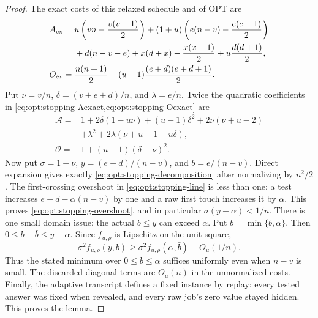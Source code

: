 \begin{proof}
The exact costs of this relaxed schedule and of OPT are
\begin{align}
 A_{\rm ex}={}&
 u\left(vn-\frac{v(v-1)}2\right)
 +(1+u)\left(e(n-v)-\frac{e(e-1)}2\right) \notag\\
 &+d(n-v-e)+x(d+x)-\frac{x(x-1)}2
 +u\frac{d(d+1)}2,
 \label{eq:opt:stopping-Aexact}\\
 O_{\rm ex}={}&\frac{n(n+1)}2
 +(u-1)\frac{(e+d)(e+d+1)}2.
 \label{eq:opt:stopping-Oexact}
\end{align}
Put $\nu=v/n$, $\delta=(v+e+d)/n$, and $\lambda=e/n$.  Twice the quadratic
coefficients in \cref{eq:opt:stopping-Aexact,eq:opt:stopping-Oexact} are
\begin{align*}
 \mathcal A={}&1+2\delta(1-u\nu)+(u-1)\delta^2
 +2\nu(\nu+u-2)\\
 &+\lambda^2+2\lambda(\nu+u-1-u\delta),\\
 \mathcal O={}&1+(u-1)(\delta-\nu)^2.
\end{align*}
Now put $\sigma=1-\nu$, $y=(e+d)/(n-v)$, and $b=e/(n-v)$.
Direct expansion gives exactly \cref{eq:opt:stopping-decomposition} after
normalizing by $n^2/2$.  The first-crossing overshoot in
\cref{eq:opt:stopping-line} is less than one: a test increases
$e+d-\alpha(n-v)$ by one and a raw first touch increases it by $\alpha$.
This proves \cref{eq:opt:stopping-overshoot}, and in particular
$\sigma(y-\alpha)<1/n$.  There is one small domain issue: the actual
$b\le y$ can exceed $\alpha$.  Put $\bar b=\min\{b,\alpha\}$.  Then
$0\le b-\bar b\le y-\alpha$.  Since $f_{u,\rho}$ is Lipschitz on the unit
square,
\begin{equation}
 \sigma^2 f_{u,\rho}(y,b)
 \ge \sigma^2 f_{u,\rho}(\alpha,\bar b)-O_u(1/n).
\end{equation}
Thus the stated minimum over $0\le\bar b\le\alpha$ suffices uniformly even
when $n-v$ is small.  The discarded diagonal terms are $O_u(n)$ in the
unnormalized costs.
Finally, the adaptive transcript defines a fixed instance by replay: every
tested answer was fixed when revealed, and every raw job's zero value stayed
hidden.  This proves the lemma.
\end{proof}

